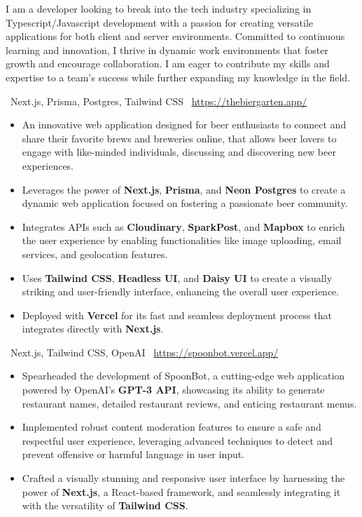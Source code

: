 \documentclass[9pt,a4paper,ragged2e,withhyper]{altacv}
\newcommand{\project}[4]{
		\cvsubsection{#1}
		\vspace{-0.25em}
		{\small \faCode\,\,\,#2}\newline
		{\small \faDesktop\,\,\,\url{#3}}
		\vspace{0.5em}
		\begin{itemize}
			#4
		\end{itemize}
	}
\begin{document}

\makecvheader
{}

\begin{paracol}{2}
	I am a developer looking to break into the tech industry specializing in Typescript/Javascript development with a passion for creating versatile applications for both client and server environments.
	\vspace{0.5em}\newline
	Committed to continuous learning and innovation, I thrive in dynamic work environments that foster growth and encourage collaboration. I am eager to contribute my skills and expertise to a team's success while further expanding my knowledge in the field.


	\project{
		The Biergarten App
	}{Next.js, Prisma, Postgres, Tailwind CSS}{https://thebiergarten.app/}{
		\item An innovative web application designed for beer enthusiasts to connect and share their favorite brews and breweries online, that allows beer lovers to engage with like-minded individuals, discussing and discovering new beer experiences.
		\item Leverages the power of \textbf{Next.js}, \textbf{Prisma}, and \textbf{Neon Postgres} to create a dynamic web application focused on fostering a passionate beer community.
		\item Integrates APIs such as \textbf{Cloudinary}, \textbf{SparkPost}, and \textbf{Mapbox} to enrich the user experience by enabling functionalities like image uploading, email services, and geolocation features.
		\item Uses \textbf{Tailwind CSS}, \textbf{Headless UI}, and \textbf{Daisy UI} to create a visually striking and user-friendly interface, enhancing the overall user experience.
		\item Deployed with \textbf{Vercel} for its fast and seamless deployment process that integrates directly with \textbf{Next.js}.
	}

	\divider

	\project{
		SpoonBot
	}{Next.js, Tailwind CSS, OpenAI}{https://spoonbot.vercel.app/}{
		\item Spearheaded the development of SpoonBot, a cutting-edge web application powered by OpenAI's \textbf{GPT-3 API}, showcasing its ability to generate restaurant names, detailed restaurant reviews, and enticing restaurant menus.
		\item Implemented robust content moderation features to ensure a safe and respectful user experience, leveraging advanced techniques to detect and prevent offensive or harmful language in user input.
		\item Crafted a visually stunning and responsive user interface by harnessing the power of \textbf{Next.js}, a React-based framework, and seamlessly integrating it with the versatility of \textbf{Tailwind CSS}.
	}


\end{paracol}
\end{document}
